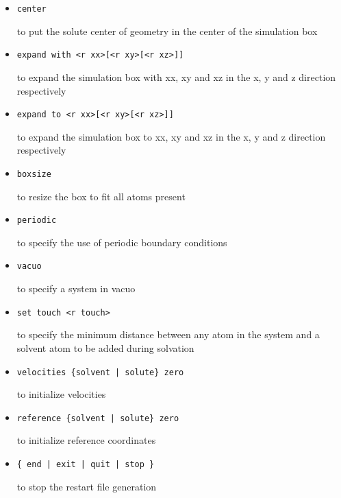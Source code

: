 \begin{itemize}
\item
\begin{verbatim}
center
\end{verbatim}
to put the solute center of geometry in the center of the
simulation box

\item
\begin{verbatim}
expand with <r xx>[<r xy>[<r xz>]]
\end{verbatim}
to expand the simulation box with xx, xy and xz in the
x, y and z direction respectively

\item
\begin{verbatim}
expand to <r xx>[<r xy>[<r xz>]]
\end{verbatim}
to expand the simulation box to xx, xy and xz in the
x, y and z direction respectively

\item
\begin{verbatim}
boxsize
\end{verbatim}
to resize the box to fit all atoms present

\item
\begin{verbatim}
periodic
\end{verbatim}
to specify the use of periodic boundary conditions

\item
\begin{verbatim}
vacuo
\end{verbatim}
to specify a system in vacuo

\item
\begin{verbatim}
set touch <r touch>
\end{verbatim}
to specify the minimum distance between any atom in
the system and a solvent atom to be added during solvation

\item
\begin{verbatim}
velocities {solvent | solute} zero
\end{verbatim}
to initialize velocities

\item
\begin{verbatim}
reference {solvent | solute} zero
\end{verbatim}
to initialize reference coordinates

\item
\begin{verbatim}
{ end | exit | quit | stop }
\end{verbatim}
to stop the restart file generation
\end{itemize}
